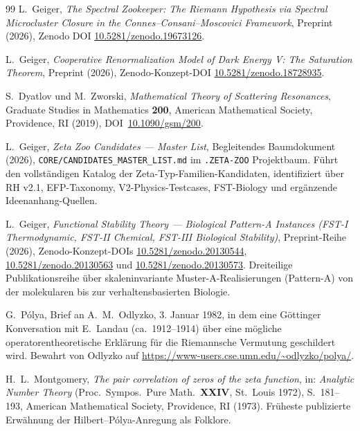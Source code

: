 \documentclass[11pt]{article}
\theoremstyle{definition}
\theoremstyle{remark}
\begin{document}
\begin{thebibliography}{99}
L.~Geiger, \emph{The Spectral Zookeeper: The Riemann Hypothesis via
Spectral Microcluster Closure in the Connes--Consani--Moscovici
Framework}, Preprint (2026), Zenodo DOI
\href{https://doi.org/10.5281/zenodo.19673126}{10.5281/zenodo.19673126}.

L.~Geiger, \emph{Cooperative Renormalization Model of Dark Energy V:
The Saturation Theorem}, Preprint (2026), Zenodo-Konzept-DOI
\href{https://doi.org/10.5281/zenodo.18728935}{10.5281/zenodo.18728935}.

S.~Dyatlov und M.~Zworski, \emph{Mathematical Theory of Scattering
Resonances}, Graduate Studies in Mathematics \textbf{200}, American
Mathematical Society, Providence, RI (2019),
DOI~\href{https://doi.org/10.1090/gsm/200}{10.1090/gsm/200}.

L.~Geiger, \emph{Zeta Zoo Candidates --- Master List}, Begleitendes
Baumdokument (2026),
\texttt{CORE/CANDIDATES\_MASTER\_LIST.md} im
\texttt{.ZETA-ZOO} Projektbaum. Führt den vollständigen Katalog der Zeta-Typ-Familien-Kandidaten,
identifiziert über RH v2.1, EFP-Taxonomy, V2-Physics-Testcases, FST-Biology und
ergänzende Ideenanhang-Quellen.

L.~Geiger, \emph{Functional Stability Theory --- Biological
Pattern-A Instances (FST-I Thermodynamic, FST-II Chemical, FST-III
Biological Stability)}, Preprint-Reihe (2026), Zenodo-Konzept-DOIs
\href{https://doi.org/10.5281/zenodo.20130544}{10.5281/zenodo.20130544},
\href{https://doi.org/10.5281/zenodo.20130563}{10.5281/zenodo.20130563}
und \href{https://doi.org/10.5281/zenodo.20130573}{10.5281/zenodo.20130573}.
Dreiteilige Publikationsreihe über skaleninvariante Muster-A-Realisierungen (Pattern-A)
von der molekularen bis zur verhaltensbasierten Biologie.


G.~P\'olya, Brief an A.~M.~Odlyzko, 3. Januar 1982, in dem eine
Göttinger Konversation mit E.~Landau (ca.\ 1912--1914) über eine
mögliche operatorentheoretische Erklärung für die Riemannsche Vermutung
geschildert wird. Bewahrt von Odlyzko auf
\url{https://www-users.cse.umn.edu/~odlyzko/polya/}.

H.~L.~Montgomery, \emph{The pair correlation of zeros of the zeta
function}, in: \emph{Analytic Number Theory} (Proc.\ Sympos.\ Pure
Math.\ \textbf{XXIV}, St.\ Louis 1972), S.~181--193, American
Mathematical Society, Providence, RI (1973). Früheste publizierte
Erwähnung der Hilbert--P\'olya-Anregung als Folklore.


\end{thebibliography}
\end{document}
